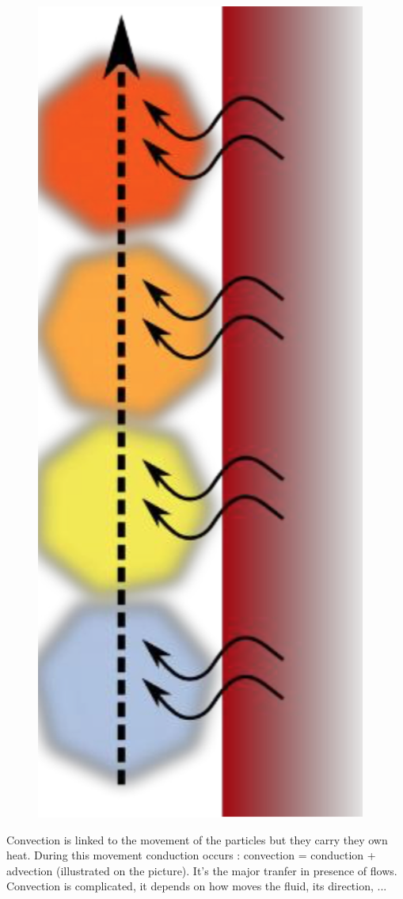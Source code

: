  		\begin{figure}
 		\vspace{-5mm}
 		\includegraphics[scale=0.15]{ch3/2}
 		\end{figure}
		Convection is linked to the movement of the particles but they carry they own heat. During this movement conduction occurs : convection = conduction + advection (illustrated on the picture). It's the major tranfer in presence of flows. Convection is complicated, it depends on how moves the fluid, its direction, ...